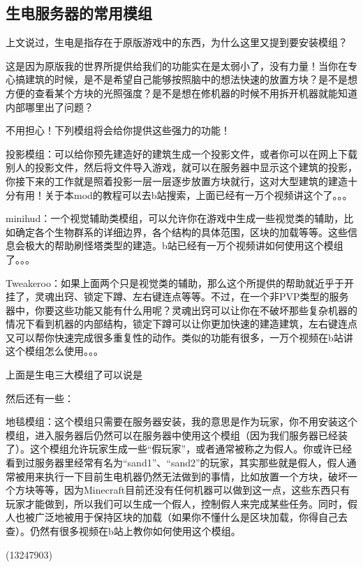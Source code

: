 \documentclass[UTF8,a4paper]{article}
\begin{document}
		\subsection{生电服务器的常用模组}
			\par 上文说过，生电是指存在于原版游戏中的东西，为什么这里又提到要安装模组？
			\par 这是因为原版我的世界所提供给我们的功能实在是太弱小了，没有力量！当你在专心搞建筑的时候，是不是希望自己能够按照脑中的想法快速的放置方块？是不是想方便的查看某个方块的光照强度？是不是想在修机器的时候不用拆开机器就能知道内部哪里出了问题？
			\par 不用担心！下列模组将会给你提供这些强力的功能！
			\par 投影模组：可以给你预先建造好的建筑生成一个投影文件，或者你可以在网上下载别人的投影文件，然后将文件导入游戏，就可以在服务器中显示这个建筑的投影，你接下来的工作就是照着投影一层一层逐步放置方块就行，这对大型建筑的建造十分有用！关于本mod的教程可以去b站搜索，上面已经有一万个视频讲这个了。。。
			\par minihud：一个视觉辅助类模组，可以允许你在游戏中生成一些视觉类的辅助，比如确定各个生物群系的详细边界，各个结构的具体范围，区块的加载等等。这些信息会极大的帮助刷怪塔类型的建造。b站已经有一万个视频讲如何使用这个模组了。。。
			\par Tweakeroo：如果上面两个只是视觉类的辅助，那么这个所提供的帮助就近乎于开挂了，灵魂出窍、锁定下蹲、左右键连点等等。不过，在一个非PVP类型的服务器中，你要这些功能又能有什么用呢？灵魂出窍可以让你在不破坏那些复杂机器的情况下看到机器的内部结构，锁定下蹲可以让你更加快速的建造建筑，左右键连点又可以帮你快速完成很多重复性的动作。类似的功能有很多，一万个视频在b站讲这个模组怎么使用。。。
			\par 上面是生电三大模组了可以说是
			\par 然后还有一些：
			\par 地毯模组：这个模组只需要在服务器安装，我的意思是作为玩家，你不用安装这个模组，进入服务器后仍然可以在服务器中使用这个模组（因为我们服务器已经装了）。这个模组允许玩家生成一些“假玩家”，或者通常被称之为假人。你或许已经看到过服务器里经常有名为“sand1”、“sand2”的玩家，其实那些就是假人，假人通常被用来执行一下目前生电机器仍然无法做到的事情，比如放置一个方块，破坏一个方块等等，因为Minecraft目前还没有任何机器可以做到这一点，这些东西只有玩家才能做到，所以我们可以生成一个假人，控制假人来完成某些任务。同时，假人也被广泛地被用于保持区块的加载（如果你不懂什么是区块加载，你得自己去查）。仍然有很多视频在b站上教你如何使用这个模组。
			\begin{flushright}(13247903)\end{flushright}
\end{document}
